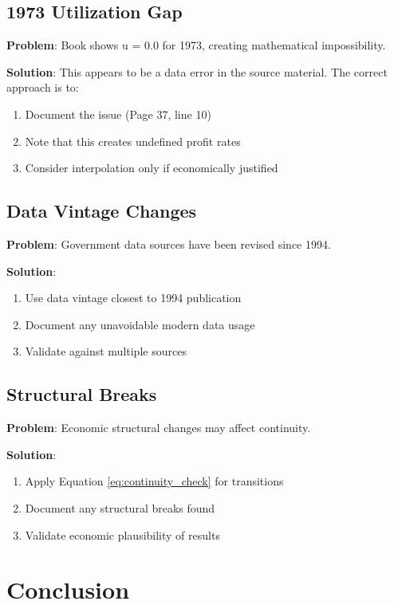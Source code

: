 \documentclass[12pt,a4paper]{article}
\begin{document}
\subsection{1973 Utilization Gap}
\textbf{Problem}: Book shows u = 0.0 for 1973, creating mathematical impossibility.

\textbf{Solution}: This appears to be a data error in the source material. The correct approach is to:
\begin{enumerate}
    \item Document the issue (Page 37, line 10)
    \item Note that this creates undefined profit rates
    \item Consider interpolation only if economically justified
\end{enumerate}

\subsection{Data Vintage Changes}
\textbf{Problem}: Government data sources have been revised since 1994.

\textbf{Solution}:
\begin{enumerate}
    \item Use data vintage closest to 1994 publication
    \item Document any unavoidable modern data usage
    \item Validate against multiple sources
\end{enumerate}

\subsection{Structural Breaks}
\textbf{Problem}: Economic structural changes may affect continuity.

\textbf{Solution}:
\begin{enumerate}
    \item Apply Equation \ref{eq:continuity_check} for transitions
    \item Document any structural breaks found
    \item Validate economic plausibility of results
\end{enumerate}

\section{Conclusion}
\end{document}

